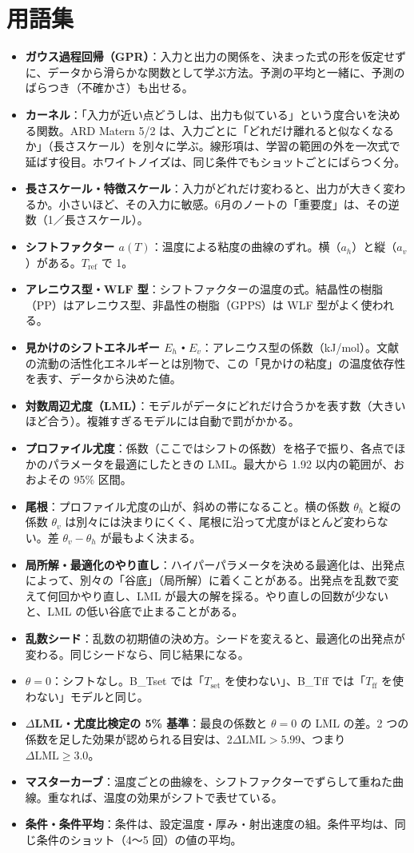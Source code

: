 \documentclass[paper=a4paper,fontsize=10.5pt,line_length=44zw,number_of_lines=38]{jlreq}
\newcommand{\Tff}{T_{\mathrm{ff}}}
\newcommand{\Tset}{T_{\mathrm{set}}}
\newcommand{\Eh}{E_{h}}
\newcommand{\Ev}{E_{v}}
\newenvironment{termlist}{\begin{itemize}[label=・,leftmargin=1\zw,labelwidth=1\zw,labelsep=0pt,itemsep=0.4ex,topsep=0.6ex,parsep=0pt]}{\end{itemize}}
\newcommand{\term}[1]{\item \textbf{#1}：}
\begin{document}
\section{用語集}
\begin{termlist}
\term{ガウス過程回帰（GPR）}入力と出力の関係を、決まった式の形を仮定せずに、データから滑らかな関数として学ぶ方法。予測の平均と一緒に、予測のばらつき（不確かさ）も出せる。
\term{カーネル}「入力が近い点どうしは、出力も似ている」という度合いを決める関数。ARD Matern 5/2 は、入力ごとに「どれだけ離れると似なくなるか」（長さスケール）を別々に学ぶ。線形項は、学習の範囲の外を一次式で延ばす役目。ホワイトノイズは、同じ条件でもショットごとにばらつく分。
\term{長さスケール・特徴スケール}入力がどれだけ変わると、出力が大きく変わるか。小さいほど、その入力に敏感。6月のノートの「重要度」は、その逆数（1／長さスケール）。
\term{シフトファクター $a(T)$}温度による粘度の曲線のずれ。横（$a_h$）と縦（$a_v$）がある。$T_{\mathrm{ref}}$ で 1。
\term{アレニウス型・WLF 型}シフトファクターの温度の式。結晶性の樹脂（PP）はアレニウス型、非晶性の樹脂（GPPS）は WLF 型がよく使われる。
\term{見かけのシフトエネルギー $\Eh$・$\Ev$}アレニウス型の係数（kJ/mol）。文献の流動の活性化エネルギーとは別物で、この「見かけの粘度」の温度依存性を表す、データから決めた値。
\term{対数周辺尤度（LML）}モデルがデータにどれだけ合うかを表す数（大きいほど合う）。複雑すぎるモデルには自動で罰がかかる。
\term{プロファイル尤度}係数（ここではシフトの係数）を格子で振り、各点でほかのパラメータを最適にしたときの LML。最大から 1.92 以内の範囲が、おおよその 95\% 区間。
\term{尾根}プロファイル尤度の山が、斜めの帯になること。横の係数 $\theta_h$ と縦の係数 $\theta_v$ は別々には決まりにくく、尾根に沿って尤度がほとんど変わらない。差 $\theta_v-\theta_h$ が最もよく決まる。
\term{局所解・最適化のやり直し}ハイパーパラメータを決める最適化は、出発点によって、別々の「谷底」（局所解）に着くことがある。出発点を乱数で変えて何回かやり直し、LML が最大の解を採る。やり直しの回数が少ないと、LML の低い谷底で止まることがある。
\term{乱数シード}乱数の初期値の決め方。シードを変えると、最適化の出発点が変わる。同じシードなら、同じ結果になる。
\term{$\theta=0$}シフトなし。B\_Tset では「$\Tset$ を使わない」、B\_Tff では「$\Tff$ を使わない」モデルと同じ。
\term{$\Delta$LML・尤度比検定の 5\% 基準}最良の係数と $\theta=0$ の LML の差。2 つの係数を足した効果が認められる目安は、$2\Delta\mathrm{LML}>5.99$、つまり $\Delta\mathrm{LML}\ge3.0$。
\term{マスターカーブ}温度ごとの曲線を、シフトファクターでずらして重ねた曲線。重なれば、温度の効果がシフトで表せている。
\term{条件・条件平均}条件は、設定温度・厚み・射出速度の組。条件平均は、同じ条件のショット（4〜5 回）の値の平均。

\end{termlist}
\end{document}
